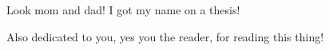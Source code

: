 \thispagestyle{empty}
{}

\vspace*{3cm}

\begin{center}
  Look mom and dad! I got my name on a thesis!  
\end{center}

\medskip

\begin{center}
  Also dedicated to you, yes you the reader, for reading this thing!
\end{center}